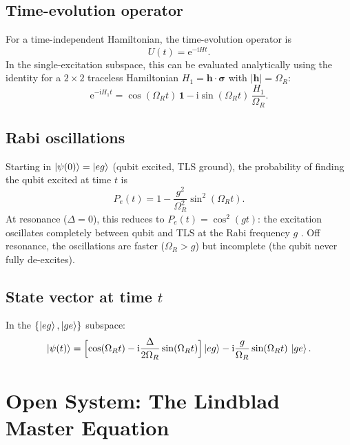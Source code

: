 \documentclass[12pt,a4paper]{article}
\newcommand{\ii}{\mathrm{i}}
\newcommand{\ee}{\mathrm{e}}
\newcommand{\D}{\Delta}
\begin{document}
\subsection{Time-evolution operator}

For a time-independent Hamiltonian, the time-evolution operator is
\begin{equation}
  U(t) = \ee^{-\ii H t}.
\end{equation}
In the single-excitation subspace, this can be evaluated analytically
using the identity for a $2\times 2$ traceless Hamiltonian
$H_1 = \mathbf{h}\cdot\boldsymbol{\sigma}$ with
$|\mathbf{h}| = \Omega_R$:
\begin{equation}
  \ee^{-\ii H_1 t}
  = \cos(\Omega_R t)\,\mathbf{1}
  - \ii\sin(\Omega_R t)\,\frac{H_1}{\Omega_R}.
  \label{eq:U_analytic}
\end{equation}

\subsection{Rabi oscillations}

Starting in $\ket{\psi(0)} = \ket{eg}$ (qubit excited, TLS ground), the
probability of finding the qubit excited at time $t$ is
\begin{equation}
  \boxed{
  P_e(t) = 1 - \frac{g^2}{\Omega_R^2}\sin^2(\Omega_R t).
  }
  \label{eq:Rabi}
\end{equation}
At resonance ($\D=0$), this reduces to $P_e(t) = \cos^2(gt)$: the
excitation oscillates completely between qubit and TLS at the Rabi
frequency $g$ \cite{Haroche2006}.
Off resonance, the oscillations are faster ($\Omega_R > g$) but
incomplete (the qubit never fully de-excites).

\subsection{State vector at time $t$}

In the $\{\ket{eg},\ket{ge}\}$ subspace:
\begin{equation}
  \ket{\psi(t)} =
  \Bigl[\cos(\Omega_R t) - \ii\frac{\D}{2\Omega_R}\sin(\Omega_R t)\Bigr]\ket{eg}
  - \ii\frac{g}{\Omega_R}\sin(\Omega_R t)\,\ket{ge}.
  \label{eq:psi_t}
\end{equation}

\section{Open System: The Lindblad Master Equation}
\end{document}

